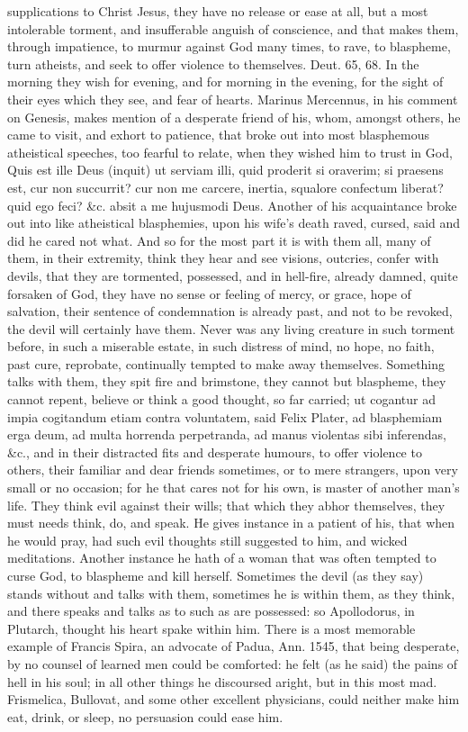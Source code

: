 {supplications to Christ Jesus, they have no release or ease at all, but
a most intolerable torment, and insufferable anguish of conscience, and
that makes them, through impatience, to murmur against God many times,
to rave, to blaspheme, turn atheists, and seek to offer violence to
themselves. Deut.  65, 68. In the morning they wish for evening,
and for morning in the evening, for the sight of their eyes which they
see, and fear of hearts. Marinus Mercennus, in his comment on
Genesis, makes mention of a desperate friend of his, whom, amongst
others, he came to visit, and exhort to patience, that broke out into
most blasphemous atheistical speeches, too fearful to relate, when they
wished him to trust in God, Quis est ille Deus (inquit) ut serviam
illi, quid proderit si oraverim; si praesens est, cur non succurrit?
cur non me carcere, inertia, squalore confectum liberat? quid ego feci?
\&c. absit a me hujusmodi Deus. Another of his acquaintance broke out
into like atheistical blasphemies, upon his wife's death raved, cursed,
said and did he cared not what. And so for the most part it is with
them all, many of them, in their extremity, think they hear and see
visions, outcries, confer with devils, that they are tormented,
possessed, and in hell-fire, already damned, quite forsaken of God,
they have no sense or feeling of mercy, or grace, hope of salvation,
their sentence of condemnation is already past, and not to be revoked,
the devil will certainly have them. Never was any living creature in
such torment before, in such a miserable estate, in such distress of
mind, no hope, no faith, past cure, reprobate, continually tempted to
make away themselves. Something talks with them, they spit fire and
brimstone, they cannot but blaspheme, they cannot repent, believe or
think a good thought, so far carried; ut cogantur ad impia cogitandum
etiam contra voluntatem, said Felix Plater, ad blasphemiam erga
deum, ad multa horrenda perpetranda, ad manus violentas sibi
inferendas, \&c., and in their distracted fits and desperate humours, to
offer violence to others, their familiar and dear friends sometimes, or
to mere strangers, upon very small or no occasion; for he that cares
not for his own, is master of another man's life. They think evil
against their wills; that which they abhor themselves, they must needs
think, do, and speak. He gives instance in a patient of his, that when
he would pray, had such evil thoughts still suggested to him, and
wicked meditations. Another instance he hath of a woman that was
often tempted to curse God, to blaspheme and kill herself. Sometimes
the devil (as they say) stands without and talks with them, sometimes
he is within them, as they think, and there speaks and talks as to such
as are possessed: so Apollodorus, in Plutarch, thought his heart spake
within him. There is a most memorable example of Francis Spira,
an advocate of Padua, Ann. 1545, that being desperate, by no counsel of
learned men could be comforted: he felt (as he said) the pains of hell
in his soul; in all other things he discoursed aright, but in this most
mad. Frismelica, Bullovat, and some other excellent physicians, could
neither make him eat, drink, or sleep, no persuasion could ease him.

}
